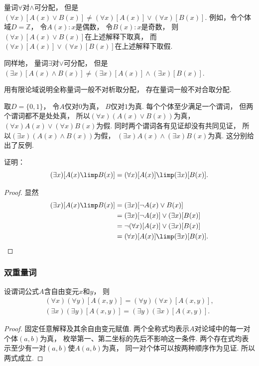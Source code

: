 \begin{remark}
量词\(\forall\)对\(\land\)可分配，
但是\((\forall x)[A(x) \lor B(x)]
\neq (\forall x)[A(x)] \lor (\forall x)[B(x)]\).
例如，令个体域\(D=\mathbb{Z}\)，
令\(A(x): \text{$x$是偶数}\)，
令\(B(x): \text{$x$是奇数}\)，
则\((\forall x)[A(x) \lor B(x)]\)在上述解释下取真，
而\((\forall x)[A(x)] \lor (\forall x)[B(x)]\)在上述解释下取假.

同样地，
量词\(\exists\)对\(\lor\)可分配，
但是\((\exists x)[A(x) \land B(x)]
\neq (\exists x)[A(x)] \land (\exists x)[B(x)]\).
\end{remark}
\begin{example}
    用有限论域说明全称量词一般不对析取分配，
    存在量词一般不对合取分配.
    \begin{solution}
        取\(D=\{0,1\}\)，
        令\(A\)仅对\(0\)为真，
        \(B\)仅对\(1\)为真.
        每个个体至少满足一个谓词，
        但两个谓词都不是处处真，
        所以\((\forall x)(A(x)\lor B(x))\)为真，
        \((\forall x)A(x)\lor(\forall x)B(x)\)为假.
        同时两个谓词各有见证却没有共同见证，
        所以\((\exists x)(A(x)\land B(x))\)为假，
        \((\exists x)A(x)\land(\exists x)B(x)\)为真.
        这分别给出了反例.
    \end{solution}
\end{example}

\begin{example}
证明：\begin{equation}
	(\exists x)[A(x) \limp B(x)]
	= (\forall x)[A(x)] \limp (\exists x)[B(x)].
\end{equation}
\begin{proof}
显然\begin{align*}
	(\exists x)[A(x) \limp B(x)]
	&= (\exists x)[\neg A(x) \lor B(x)] \\
	&= (\exists x)[\neg A(x)] \lor (\exists x)[B(x)] \\
	&= \neg(\forall x)[A(x)] \lor (\exists x)[B(x)] \\
	&= (\forall x)[A(x)] \limp (\exists x)[B(x)].
	\qedhere
\end{align*}
\end{proof}
\end{example}

\subsubsection{双重量词}
设谓词公式\(A\)含自由变元\(x\)和\(y\)，
则\begin{gather}
	(\forall x)(\forall y)[A(x,y)]
	= (\forall y)(\forall x)[A(x,y)], \\
	(\exists x)(\exists y)[A(x,y)]
	= (\exists y)(\exists x)[A(x,y)].
\end{gather}
\begin{proof}
    固定任意解释及其余自由变元赋值.
    两个全称式均表示\(A\)对论域中的每一对个体\((a,b)\)为真，
    枚举第一、第二坐标的先后不影响这一条件.
    两个存在式均表示至少有一对\((a,b)\)使\(A(a,b)\)为真，
    同一对个体可以按两种顺序作为见证.
    所以两式成立.
\end{proof}

